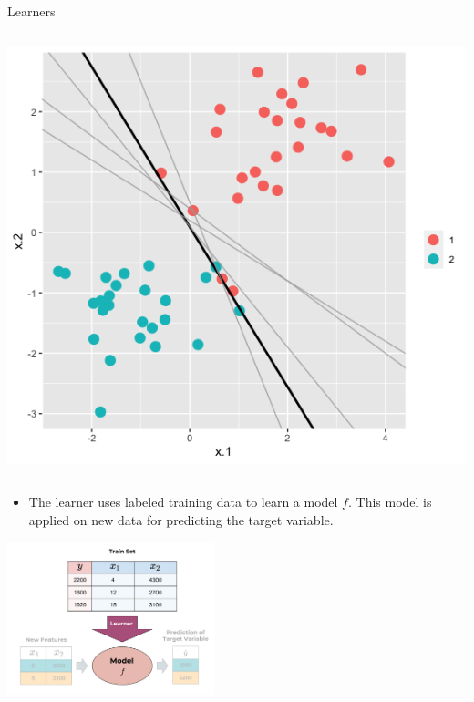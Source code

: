 \documentclass[11pt,compress,t,notes=noshow, xcolor=table]{beamer}
\begin{document}
\begin{vbframe}{Learners}
\begin{columns}
\begin{column}{0.4\textwidth}
  \begin{center}
    \includegraphics[width=\textwidth]{slides/ml-basics/figure_man/Model_Classification_Plot.png} 
  \end{center}
\end{column}    
\end{columns}  

\begin{itemize}
\item The learner uses labeled training data to learn a model $f$. This model is applied on new data for predicting the target variable.
\end{itemize}

 \begin{center}
    \includegraphics[width = 0.45\textwidth]{figure_man/the_inducer_web.png}
  \end{center}

\end{vbframe}
\end{document}
